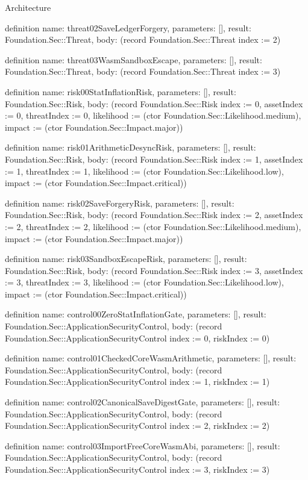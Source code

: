 \begin{lexlean}{Architecture}
\begin{semanticmodule}
definition{
  name: threat02SaveLedgerForgery,
  parameters: [],
  result: Foundation.Sec::Threat,
  body: (record Foundation.Sec::Threat {index := 2})
}

definition{
  name: threat03WasmSandboxEscape,
  parameters: [],
  result: Foundation.Sec::Threat,
  body: (record Foundation.Sec::Threat {index := 3})
}

definition{
  name: risk00StatInflationRisk,
  parameters: [],
  result: Foundation.Sec::Risk,
  body: (record Foundation.Sec::Risk {index := 0, assetIndex := 0, threatIndex := 0, likelihood := (ctor Foundation.Sec::Likelihood.medium), impact := (ctor Foundation.Sec::Impact.major)})
}

definition{
  name: risk01ArithmeticDesyncRisk,
  parameters: [],
  result: Foundation.Sec::Risk,
  body: (record Foundation.Sec::Risk {index := 1, assetIndex := 1, threatIndex := 1, likelihood := (ctor Foundation.Sec::Likelihood.low), impact := (ctor Foundation.Sec::Impact.critical)})
}

definition{
  name: risk02SaveForgeryRisk,
  parameters: [],
  result: Foundation.Sec::Risk,
  body: (record Foundation.Sec::Risk {index := 2, assetIndex := 2, threatIndex := 2, likelihood := (ctor Foundation.Sec::Likelihood.medium), impact := (ctor Foundation.Sec::Impact.major)})
}

definition{
  name: risk03SandboxEscapeRisk,
  parameters: [],
  result: Foundation.Sec::Risk,
  body: (record Foundation.Sec::Risk {index := 3, assetIndex := 3, threatIndex := 3, likelihood := (ctor Foundation.Sec::Likelihood.low), impact := (ctor Foundation.Sec::Impact.critical)})
}

definition{
  name: control00ZeroStatInflationGate,
  parameters: [],
  result: Foundation.Sec::ApplicationSecurityControl,
  body: (record Foundation.Sec::ApplicationSecurityControl {index := 0, riskIndex := 0})
}

definition{
  name: control01CheckedCoreWasmArithmetic,
  parameters: [],
  result: Foundation.Sec::ApplicationSecurityControl,
  body: (record Foundation.Sec::ApplicationSecurityControl {index := 1, riskIndex := 1})
}

definition{
  name: control02CanonicalSaveDigestGate,
  parameters: [],
  result: Foundation.Sec::ApplicationSecurityControl,
  body: (record Foundation.Sec::ApplicationSecurityControl {index := 2, riskIndex := 2})
}

definition{
  name: control03ImportFreeCoreWasmAbi,
  parameters: [],
  result: Foundation.Sec::ApplicationSecurityControl,
  body: (record Foundation.Sec::ApplicationSecurityControl {index := 3, riskIndex := 3})
}


\end{semanticmodule}
\end{lexlean}
